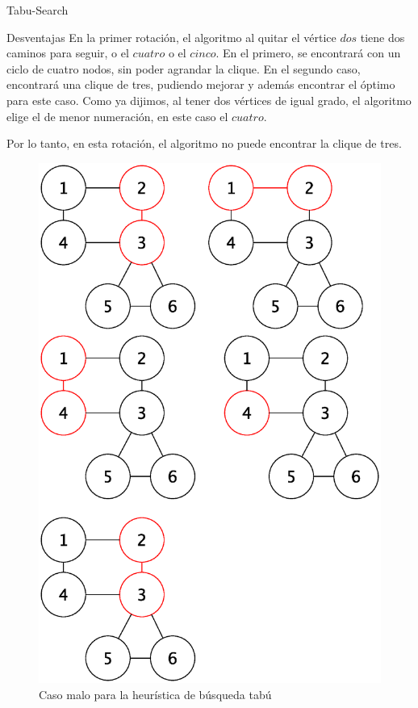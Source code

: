 \begin{section}{Tabu-Search}
\begin{subsection}{Desventajas}
		En la primer rotación, el algoritmo al quitar el vértice $dos$ tiene dos caminos para seguir, o el $cuatro$ o el $cinco$. En el primero, se encontrará con un ciclo de cuatro nodos, sin poder agrandar la clique. En el segundo caso, encontrará una clique de tres, pudiendo mejorar y además encontrar el óptimo para este caso. Como ya dijimos, al tener dos vértices de igual grado, el algoritmo elige el de menor numeración, en este caso el $cuatro$. 

		Por lo tanto, en esta rotación, el algoritmo no puede encontrar la clique de tres.

			\begin{figure}[H]
				\centering
		    	\includegraphics[scale=0.5]{tabu_search/segCasoMalo_cont.eps}
			    \caption{Caso malo para la heurística de búsqueda tabú}
			    \label{fig:seguimiento_busqueda_tabu_continuacion}
			\end{figure}


\end{subsection}
\end{section}
